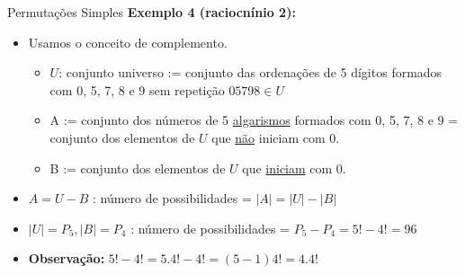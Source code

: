 \documentclass[aspectratio=169]{beamer}
\begin{document}
\begin{frame}{Permutações Simples}
    \textbf{Exemplo 4 (raciocnínio 2):}

    \vspace{2mm}

    \begin{itemize}
        \item Usamos o conceito de complemento.
        \begin{itemize}
            \item[] $U$: conjunto universo := conjunto das ordenações de 5 dígitos formados com 0, 5, 7, 8 e 9 sem repetição $05798 \in U$ \pause
            \item[] A := conjunto dos números de 5 \underline{algarismos} formados com 0, 5, 7, 8 e 9 = conjunto dos elementos de $U$ que \underline{não} iniciam com 0. \pause
            \item[] B := conjunto dos elementos de $U$ que \underline{iniciam} com 0. \pause
        \end{itemize}
    \end{itemize}

    \vspace{3mm}
    \begin{itemize}
        \item $ A = U - B$ : número de possibilidades = $|A| = |U| - |B|$
    \end{itemize}

    \pause
    \vspace{3mm}
    \begin{itemize}
        \item $ |U| = P_5, |B| = P_4$ : número de possibilidades = $P_5 - P_4 = 5! - 4! = 96$
    \end{itemize}

    \pause
    \vspace{3mm}
    \begin{itemize}
        \item[] \textbf{Observação:} $5! - 4! = 5.4! - 4! = (5-1) 4! = 4.4!$
    \end{itemize}
\end{frame}
\end{document}
